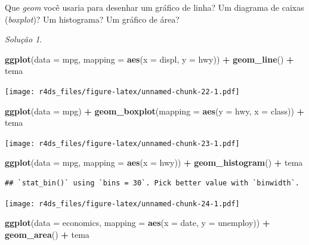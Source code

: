 \documentclass[
]{latex/krantz}
\newenvironment{Shaded}{\begin{snugshade}}{\end{snugshade}}
\newcommand{\AttributeTok}[1]{\textcolor[rgb]{0.13,0.29,0.53}{#1}}
\newcommand{\FunctionTok}[1]{\textcolor[rgb]{0.13,0.29,0.53}{\textbf{#1}}}
\newcommand{\NormalTok}[1]{#1}
\newcommand{\SpecialCharTok}[1]{\textcolor[rgb]{0.81,0.36,0.00}{\textbf{#1}}}
\theoremstyle{definition}
\theoremstyle{definition}
\theoremstyle{definition}
\theoremstyle{definition}
\theoremstyle{remark}
\newtheorem*{solution}{Solução}
\begin{document}
Que \emph{geom} você usaria para desenhar um gráfico de linha? Um diagrama de caixas (\emph{boxplot})? Um histograma? Um gráfico de área?

\begin{solution}
\leavevmode

\begin{Shaded}
\begin{Highlighting}[]
\FunctionTok{ggplot}\NormalTok{(}\AttributeTok{data =}\NormalTok{ mpg, }\AttributeTok{mapping =} \FunctionTok{aes}\NormalTok{(}\AttributeTok{x =}\NormalTok{ displ, }\AttributeTok{y =}\NormalTok{ hwy)) }\SpecialCharTok{+}
    \FunctionTok{geom\_line}\NormalTok{() }\SpecialCharTok{+}
\NormalTok{    tema}
\end{Highlighting}
\end{Shaded}

\texttt{[image: r4ds\_files/figure-latex/unnamed-chunk-22-1.pdf]}

\begin{Shaded}
\begin{Highlighting}[]
\FunctionTok{ggplot}\NormalTok{(}\AttributeTok{data =}\NormalTok{ mpg) }\SpecialCharTok{+}
    \FunctionTok{geom\_boxplot}\NormalTok{(}\AttributeTok{mapping =} \FunctionTok{aes}\NormalTok{(}\AttributeTok{y =}\NormalTok{ hwy, }\AttributeTok{x =}\NormalTok{ class)) }\SpecialCharTok{+}
\NormalTok{    tema}
\end{Highlighting}
\end{Shaded}

\texttt{[image: r4ds\_files/figure-latex/unnamed-chunk-23-1.pdf]}

\begin{Shaded}
\begin{Highlighting}[]
\FunctionTok{ggplot}\NormalTok{(}\AttributeTok{data =}\NormalTok{ mpg, }\AttributeTok{mapping =} \FunctionTok{aes}\NormalTok{(}\AttributeTok{x =}\NormalTok{ hwy)) }\SpecialCharTok{+}
    \FunctionTok{geom\_histogram}\NormalTok{() }\SpecialCharTok{+}
\NormalTok{    tema}
\end{Highlighting}
\end{Shaded}

\begin{verbatim}
## `stat_bin()` using `bins = 30`. Pick better value with `binwidth`.
\end{verbatim}

\texttt{[image: r4ds\_files/figure-latex/unnamed-chunk-24-1.pdf]}

\begin{Shaded}
\begin{Highlighting}[]
\FunctionTok{ggplot}\NormalTok{(}\AttributeTok{data =}\NormalTok{ economics, }\AttributeTok{mapping =} \FunctionTok{aes}\NormalTok{(}\AttributeTok{x =}\NormalTok{ date, }\AttributeTok{y =}\NormalTok{ unemploy)) }\SpecialCharTok{+}
    \FunctionTok{geom\_area}\NormalTok{() }\SpecialCharTok{+}
\NormalTok{    tema}
\end{Highlighting}
\end{Shaded}


\end{solution}
\end{document}

